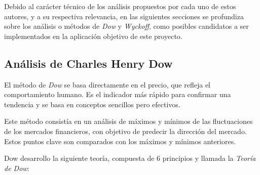 Debido al carácter técnico de los análisis propuestos por cada uno de estos autores, y a su respectiva relevancia, en las siguientes secciones se profundiza sobre los análisis o métodos de \textit{Dow} y \textit{Wyckoff}, como posibles candidatos a ser implementados en la aplicación objetivo de este proyecto. \newline

\subsection{Análisis de Charles Henry Dow}

El método de \textit{Dow} se basa directamente en el precio, que refleja el comportamiento humano. Es el indicador más rápido para confirmar una tendencia y se basa en conceptos sencillos pero efectivos. \newline

Este método consistía en un análisis de máximos y mínimos de las fluctuaciones de los mercados financieros, con objetivo de predecir la dirección del mercado. Estos puntos clave son comparados con los máximos y mínimos anteriores. \newline

Dow desarrollo la siguiente teoría, compuesta de 6 principios y llamada la \textit{Teoría de Dow}: \newline

